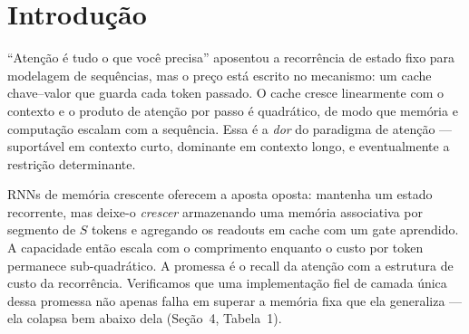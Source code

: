 \documentclass[11pt]{article}
\begin{document}
\begin{abstract}
$23{,}2\pm14{,}0$ e Based $79{,}5\pm1{,}4$, empatando com a aten\c{c}\~ao softmax
total ($100{,}0$). Em um modelo de linguagem real em n\'ivel de caractere
(TinyStories, 2 camadas, $d=128$, 3 seeds, dois contextos) a IGA empata com um
baseline de mem\'oria fixa de mesma largura em bits-por-caractere dentro do
ru\'ido entre seeds --- \emph{mem\'oria constante sem custo de perplexidade} ---
enquanto uma an\'alise de custo mostra que o pr\^emio \'unico de treino \'e
amortizado por economias de infer\^encia por query que crescem com o contexto,
j\'a que a IGA \'e $O(T)$ por passo com estado constante onde a aten\c{c}\~ao
softmax \'e $O(T^2)$ por passo com cache $\propto T$. \textbf{No pain, same gain}:
o custo da mem\'oria crescente \'e removido, a qualidade \'e mantida.
\end{abstract}

\section{Introdu\c{c}\~ao}

``Aten\c{c}\~ao \'e tudo o que voc\^e precisa'' \citep{vaswani2017attention}
aposentou a recorr\^encia de estado fixo para modelagem de sequ\^encias, mas o
pre\c{c}o est\'a escrito no mecanismo: um cache chave--valor que guarda cada
token passado. O cache cresce linearmente com o contexto e o produto de aten\c{c}\~ao
por passo \'e quadr\'atico, de modo que mem\'oria e computa\c{c}\~ao escalam com a
sequ\^encia. Essa \'e a \emph{dor} do paradigma de aten\c{c}\~ao --- suport\'avel
em contexto curto, dominante em contexto longo, e eventualmente a restri\c{c}\~ao
determinante.

RNNs de mem\'oria crescente \citep{behrouz2026memorycaching} oferecem a aposta
oposta: mantenha um estado recorrente, mas deixe-o \emph{crescer} armazenando uma
mem\'oria associativa por segmento de $S$ tokens e agregando os readouts em cache
com um gate aprendido. A capacidade ent\~ao escala com o comprimento enquanto o
custo por token permanece sub-quadr\'atico. A promessa \'e o recall da aten\c{c}\~ao
com a estrutura de custo da recorr\^encia. Verificamos que uma implementa\c{c}\~ao
fiel de camada \'unica dessa promessa n\~ao apenas falha em superar a mem\'oria
fixa que ela generaliza --- ela colapsa bem abaixo dela (Se\c{c}\~ao~4, Tabela~1).
\end{document}
